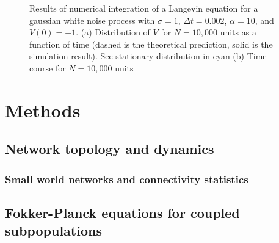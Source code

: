 \documentclass{ucetd}
\begin{document}
\begin{figure}
\centering
{}
\caption{Results of numerical integration of a Langevin equation for a gaussian white noise process with $\sigma = 1$, $\Delta t=0.002$, $\alpha=10$, and $V(0)=-1$. (a) Distribution of $V$ for $N=10,000$ units as a function of time (dashed is the theoretical prediction, solid is the simulation result). See stationary distribution in cyan (b) Time course for $N=10,000$ units}
\end{figure}


\chapter{Methods}


\section{Network topology and dynamics}

\subsection{Small world networks and connectivity statistics}

\section{Fokker-Planck equations for coupled subpopulations}
\end{document}

